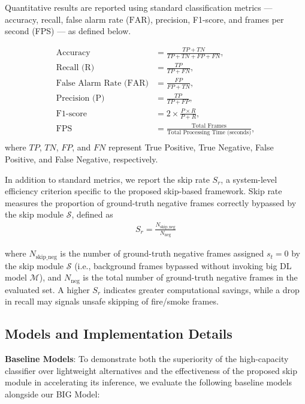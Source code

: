 \documentclass[
  10pt,
]{article}
\begin{document}
Quantitative results are reported using standard classification metrics
--- accuracy, recall, false alarm rate (\(\mathrm{FAR}\)), precision,
F1-score, and frames per second (FPS) --- as defined below.

\begin{align}
  \text{Accuracy} &= \frac{TP + TN}{TP + TN + FP + FN}, \\
  \text{Recall (R)} &= \frac{TP}{TP + FN}, \\
  \text{False Alarm Rate (FAR)} &= \frac{FP}{FP + TN}, \\
  \text{Precision (P)} &= \frac{TP}{TP + FP}, \\
  \text{F1-score} &= 2 \times \frac{P \times R}{P + R}, \\
  \text{FPS} &= \frac{\text{Total Frames}}{\text{Total Processing Time (seconds)}},\\
\end{align}
where $TP$, $TN$, $FP$, and $FN$ represent True Positive, True Negative, False Positive, and False Negative, respectively.

In addition to standard metrics, we report the skip rate $S_r$, a system-level
efficiency criterion specific to the proposed skip-based framework. Skip rate
measures the proportion of ground-truth negative frames correctly bypassed by
the skip module $\mathcal{S}$, defined as
\begin{align}
  S_r = \frac{N_{\text{skip\_neg}}}{N_{\text{neg}}}
\end{align}

where $N_{\text{skip\_neg}}$ is the number of ground-truth negative frames
assigned $s_t = 0$ by the skip module $\mathcal{S}$ (i.e., background frames
bypassed without invoking big DL model $\mathcal{M}$), and $N_{\text{neg}}$ is
the total number of ground-truth negative frames in the evaluated set. A higher
$S_r$ indicates greater computational savings, while a drop in recall may
signals unsafe skipping of fire/smoke frames.

\subsection{Models and Implementation Details}\label{sec:baselines}

\textbf{Baseline Models}: To demonstrate both the superiority of the
high-capacity classifier over lightweight alternatives and the
effectiveness of the proposed skip module in accelerating its inference,
we evaluate the following baseline models alongside our BIG Model:
\end{document}
